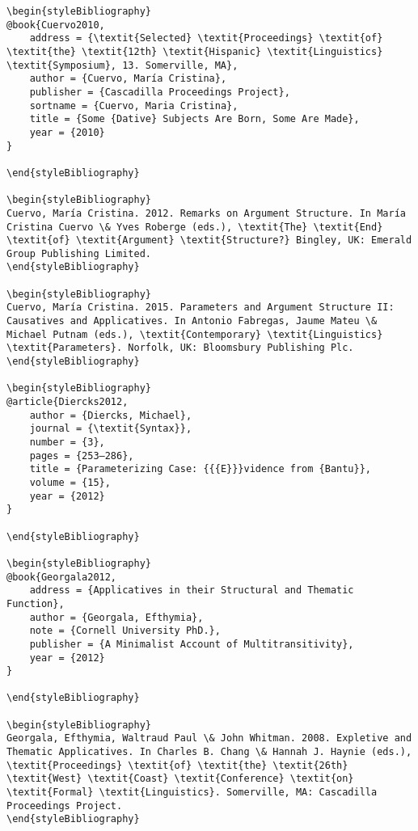 \documentclass[output=paper]{langscibook}
\begin{document}
\begin{verbatim}
\begin{styleBibliography}
@book{Cuervo2010,
	address = {\textit{Selected} \textit{Proceedings} \textit{of} \textit{the} \textit{12th} \textit{Hispanic} \textit{Linguistics} \textit{Symposium}, 13. Somerville, MA},
	author = {Cuervo, María Cristina},
	publisher = {Cascadilla Proceedings Project},
	sortname = {Cuervo, Maria Cristina},
	title = {Some {Dative} Subjects Are Born, Some Are Made},
	year = {2010}
}

\end{styleBibliography}

\begin{styleBibliography}
Cuervo, María Cristina. 2012. Remarks on Argument Structure. In María Cristina Cuervo \& Yves Roberge (eds.), \textit{The} \textit{End} \textit{of} \textit{Argument} \textit{Structure?} Bingley, UK: Emerald Group Publishing Limited.
\end{styleBibliography}

\begin{styleBibliography}
Cuervo, María Cristina. 2015. Parameters and Argument Structure II: Causatives and Applicatives. In Antonio Fabregas, Jaume Mateu \& Michael Putnam (eds.), \textit{Contemporary} \textit{Linguistics} \textit{Parameters}. Norfolk, UK: Bloomsbury Publishing Plc.
\end{styleBibliography}

\begin{styleBibliography}
@article{Diercks2012,
	author = {Diercks, Michael},
	journal = {\textit{Syntax}},
	number = {3},
	pages = {253–286},
	title = {Parameterizing Case: {{{E}}}vidence from {Bantu}},
	volume = {15},
	year = {2012}
}

\end{styleBibliography}

\begin{styleBibliography}
@book{Georgala2012,
	address = {Applicatives in their Structural and Thematic Function},
	author = {Georgala, Efthymia},
	note = {Cornell University PhD.},
	publisher = {A Minimalist Account of Multitransitivity},
	year = {2012}
}

\end{styleBibliography}

\begin{styleBibliography}
Georgala, Efthymia, Waltraud Paul \& John Whitman. 2008. Expletive and Thematic Applicatives. In Charles B. Chang \& Hannah J. Haynie (eds.), \textit{Proceedings} \textit{of} \textit{the} \textit{26th} \textit{West} \textit{Coast} \textit{Conference} \textit{on} \textit{Formal} \textit{Linguistics}. Somerville, MA: Cascadilla Proceedings Project.
\end{styleBibliography}


\end{verbatim}
\end{document}
